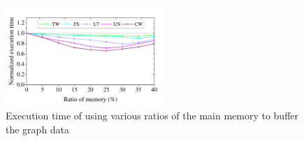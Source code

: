 \documentclass[10pt,journal,compsoc]{IEEEtran}
\begin{document}
\begin{figure}[t]
	\vspace{-10pt}
	\centering
	\includegraphics[width=6cm]{memory_size.pdf}
	\vspace{-18pt}
	\caption{Execution time of using various ratios of the main memory to buffer the graph data}
	\label{memory_size}
	\vspace{-24pt}
\end{figure}



\vspace{-8pt}
\end{document}
